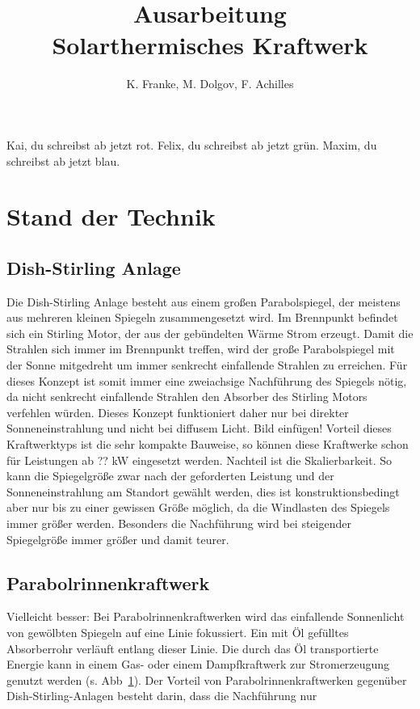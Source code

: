 \documentclass[fontsize=10pt,paper=a4,bibliography=totoc]{scrartcl}
\title{Ausarbeitung\\Solarthermisches Kraftwerk}
\author{K. Franke, M. Dolgov, F. Achilles}
\newcommand{\kai}[1]{{ \color{red} #1 }}
\newcommand{\felix}[1]{{ \color{green} #1}}
\newcommand{\maxim}[1]{{ \color{blue} #1}}
\begin{document}
\maketitle
%
\kai{Kai, du schreibst ab jetzt rot.}\newline
\felix{Felix, du schreibst ab jetzt grün.}\newline
\maxim{Maxim, du schreibst ab jetzt blau.}\newline

\section{Stand der Technik}

\subsection{Dish-Stirling Anlage}
Die Dish-Stirling Anlage besteht aus einem großen Parabolspiegel, der meistens aus mehreren kleinen Spiegeln zusammengesetzt wird. Im Brennpunkt befindet sich ein Stirling Motor, der aus der gebündelten Wärme Strom erzeugt. Damit die Strahlen sich immer im Brennpunkt treffen, wird der große Parabolspiegel mit der Sonne mitgedreht um immer senkrecht einfallende Strahlen zu erreichen. Für dieses Konzept ist somit immer eine zweiachsige Nachführung des Spiegels nötig, da nicht senkrecht einfallende Strahlen den Absorber des Stirling Motors verfehlen würden. Dieses Konzept funktioniert daher nur bei direkter Sonneneinstrahlung und nicht bei diffusem Licht. Bild einfügen! Vorteil dieses Kraftwerktyps ist die sehr kompakte Bauweise, so können diese Kraftwerke schon für Leistungen ab ??
 kW eingesetzt werden. Nachteil ist die Skalierbarkeit. So kann die Spiegelgröße zwar nach der geforderten Leistung und der Sonneneinstrahlung am Standort gewählt werden, dies ist konstruktionsbedingt aber nur bis zu einer gewissen Größe möglich, da die Windlasten des Spiegels immer größer werden. Besonders die Nachführung wird bei steigender Spiegelgröße immer größer und damit teurer.
 
\subsection{Parabolrinnenkraftwerk}

\maxim{Vielleicht besser: Bei Parabolrinnenkraftwerken wird das einfallende Sonnenlicht von gewölbten Spiegeln auf eine Linie fokussiert. Ein mit Öl gefülltes Absorberrohr verläuft entlang dieser Linie. Die durch das Öl transportierte Energie kann in einem Gas- oder einem Dampfkraftwerk zur Stromerzeugung genutzt werden (s. Abb~\ref{pic:parabolrinnen}). Der Vorteil von Parabolrinnenkraftwerken gegenüber Dish-Stirling-Anlagen besteht darin, dass die Nachführung nur 

\begin{figure}[h]
	\centering
	\def\svgwidth{.6\textwidth}
	
	\label{pic:parabolrinnen}
\end{figure}
}\hfill\newline\newline
\end{document}
